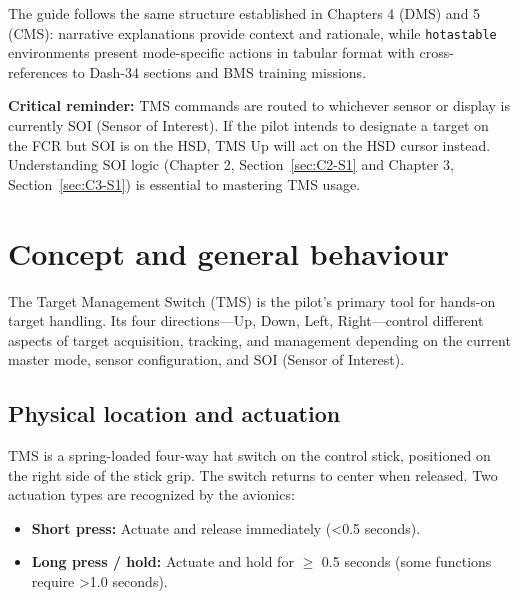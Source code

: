 \documentclass[11pt, a4paper, twoside]{report}
\begin{document}
The guide follows the same structure established in Chapters 4 (DMS) and 5 (CMS): narrative explanations provide context and rationale, while \texttt{hotastable} environments present mode-specific actions in tabular format with cross-references to Dash-34 sections and BMS training missions.

\textbf{Critical reminder:} TMS commands are routed to whichever sensor or display is currently SOI (Sensor of Interest). If the pilot intends to designate a target on the FCR but SOI is on the HSD, TMS Up will act on the HSD cursor instead. Understanding SOI logic (Chapter 2, Section~\ref{sec:C2-S1} and Chapter 3, Section~\ref{sec:C3-S1}) is essential to mastering TMS usage.

\newpage
\section{Concept and general behaviour}
\label{sec:C4-S1}

The Target Management Switch (TMS) is the pilot's primary tool for hands-on target handling. Its four directions---Up, Down, Left, Right---control different aspects of target acquisition, tracking, and management depending on the current master mode, sensor configuration, and SOI (Sensor of Interest).

\subsection{Physical location and actuation}
\label{sec:C4-S1-S1}

TMS is a spring-loaded four-way hat switch on the control stick, positioned on the right side of the stick grip. The switch returns to center when released. Two actuation types are recognized by the avionics:

\begin{itemize}
    \item \textbf{Short press:} Actuate and release immediately (<0.5 seconds).
    \item \textbf{Long press / hold:} Actuate and hold for $\geq$ 0.5 seconds (some functions require >1.0 seconds).
\end{itemize}
\end{document}
